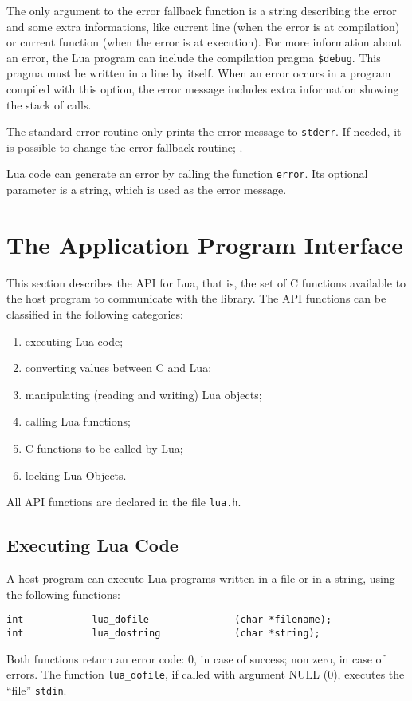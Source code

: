 The only argument to the error fallback function is a string describing
the error and some extra informations,
like current line (when the error is at compilation)
or current function (when the error is at execution).
For more information about an error,
the Lua program can include the compilation pragma \verb'$debug'.
This pragma must be written in a line by itself.
When an error occurs in a program compiled with this option,
the error message includes extra information showing the stack of calls.

The standard error routine only prints the error message
to \verb'stderr'.
If needed, it is possible to change the error fallback routine;
.

Lua code can generate an error by calling the function \verb'error'.
Its optional parameter is a string,
which is used as the error message.


\section{The Application Program Interface}

This section describes the API for Lua, that is,
the set of C functions available to the host program to communicate
with the library.
The API functions can be classified in the following categories:
\begin{enumerate}
\item executing Lua code;
\item converting values between C and Lua;
\item manipulating (reading and writing) Lua objects;
\item calling Lua functions;
\item C functions to be called by Lua;
\item locking Lua Objects.
\end{enumerate}
All API functions are declared in the file \verb'lua.h'.

\subsection{Executing Lua Code}
A host program can execute Lua programs written in a file or in a string,
using the following functions:
\begin{verbatim}
int            lua_dofile               (char *filename);
int            lua_dostring             (char *string);
\end{verbatim}
Both functions return an error code:
0, in case of success; non zero, in case of errors.
The function \verb'lua_dofile', if called with argument NULL (0),
executes the ``file'' {\tt stdin}.

